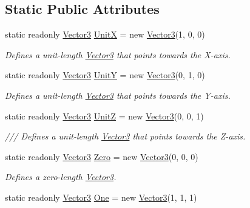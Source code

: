 \subsection*{Static Public Attributes}
\begin{DoxyCompactItemize}
\item 
static readonly \hyperlink{struct_open_t_k_1_1_vector3}{Vector3} \hyperlink{struct_open_t_k_1_1_vector3_a54bca41090c546209620c5cbad1f0a40}{Unit\-X} = new \hyperlink{struct_open_t_k_1_1_vector3}{Vector3}(1, 0, 0)
\begin{DoxyCompactList}\small\item\em Defines a unit-\/length \hyperlink{struct_open_t_k_1_1_vector3}{Vector3} that points towards the X-\/axis. \end{DoxyCompactList}\item 
static readonly \hyperlink{struct_open_t_k_1_1_vector3}{Vector3} \hyperlink{struct_open_t_k_1_1_vector3_acbc98b807526c6eecc9fc75e9a819db5}{Unit\-Y} = new \hyperlink{struct_open_t_k_1_1_vector3}{Vector3}(0, 1, 0)
\begin{DoxyCompactList}\small\item\em Defines a unit-\/length \hyperlink{struct_open_t_k_1_1_vector3}{Vector3} that points towards the Y-\/axis. \end{DoxyCompactList}\item 
static readonly \hyperlink{struct_open_t_k_1_1_vector3}{Vector3} \hyperlink{struct_open_t_k_1_1_vector3_acc3b909cd51e4989e798052ed5c5d327}{Unit\-Z} = new \hyperlink{struct_open_t_k_1_1_vector3}{Vector3}(0, 0, 1)
\begin{DoxyCompactList}\small\item\em /// Defines a unit-\/length \hyperlink{struct_open_t_k_1_1_vector3}{Vector3} that points towards the Z-\/axis. \end{DoxyCompactList}\item 
static readonly \hyperlink{struct_open_t_k_1_1_vector3}{Vector3} \hyperlink{struct_open_t_k_1_1_vector3_ab4f0cf5c4aa3471bdde372676cbaa3a5}{Zero} = new \hyperlink{struct_open_t_k_1_1_vector3}{Vector3}(0, 0, 0)
\begin{DoxyCompactList}\small\item\em Defines a zero-\/length \hyperlink{struct_open_t_k_1_1_vector3}{Vector3}. \end{DoxyCompactList}\item 
static readonly \hyperlink{struct_open_t_k_1_1_vector3}{Vector3} \hyperlink{struct_open_t_k_1_1_vector3_a12bc14ea7ad4c48e623438c7ff4ff9ed}{One} = new \hyperlink{struct_open_t_k_1_1_vector3}{Vector3}(1, 1, 1)

\end{DoxyCompactItemize}
